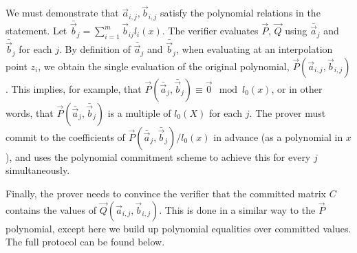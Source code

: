 We must demonstrate that $\vec{a}_{i,j}, \vec{b}_{i,j}$ satisfy the polynomial relations in the statement. Let $\bar{\vec{b}}_j = \sum_{i=1}^m \vec{b}_{ij} l_i(x)$. The verifier evaluates $\vec{P}$, $\vec{Q}$ using $\bar{\vec{a}}_j$ and $\bar{\vec{b}}_j$ for each $j$. By definition of $\bar{\vec{a}}_j$ and $\bar{\vec{b}}_j$, when evaluating at an interpolation point $z_i$, we obtain the single evaluation of the original polynomial, $\vec{P}(\vec{a}_{i,j},\vec{b}_{i,j})$. This implies, for example, that $\vec{P}(\bar{\vec{a}}_j,\bar{\vec{b}}_j) \equiv \vec{0} \mod l_0(x)$, or in other words, that $\vec{P}(\bar{\vec{a}}_j,\bar{\vec{b}}_j)$ is a multiple of $l_0(X)$ for each $j$. The prover must commit to the coefficients of $\vec{P}(\bar{\vec{a}}_j,\bar{\vec{b}}_j) / l_0(x)$ in advance (as a polynomial in $x$), and uses the polynomial commitment scheme to achieve this for every $j$ simultaneously.

Finally, the prover needs to convince the verifier that the committed matrix $C$ contains the values of $\vec{Q}(\vec{a}_{i,j},\vec{b}_{i,j})$. This is done in a similar way to the $\vec{P}$ polynomial, except here we build up polynomial equalities over committed values. The full protocol can be found below.


